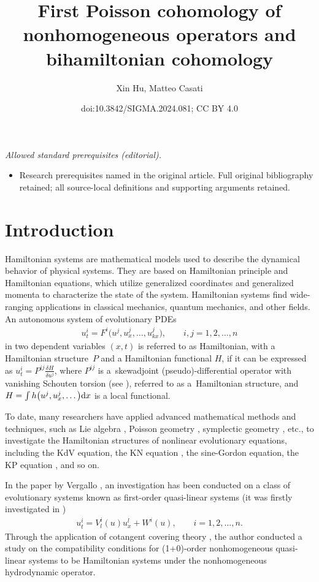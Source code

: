 \documentclass[10pt,a4paper]{amsart}
\title{First Poisson cohomology of nonhomogeneous operators and bihamiltonian cohomology}
\author{Xin Hu, Matteo Casati}
\date{doi:10.3842/SIGMA.2024.081; CC BY 4.0}
\numberwithin{equation}{section}
\begin{document}
\maketitle
\noindent\textit{Allowed standard prerequisites (editorial).}\begin{itemize}
\item Research prerequisites named in the original article. Full original bibliography retained; all source-local definitions and supporting arguments retained.
\end{itemize}\medskip
\section{Introduction}
Hamiltonian systems are mathematical models used to describe the dynamical behavior of physical systems. They are based on Hamiltonian principle and Hamiltonian equations, which utilize generalized coordinates and generalized momenta to characterize the state of the system. Hamiltonian systems find wide-ranging applications in classical mechanics, quantum mechanics, and other fields. An autonomous system of evolutionary PDEs
\begin{gather*}
u^i_t=F^i\big(u^j,u^j_x,\dots,u^j_{kx}\big), \qquad i,j=1,2,\dots,n
\end{gather*}
in two dependent variables $(x,t)$ is referred to as Hamiltonian, with a Hamiltonian structure~$P$ and a Hamiltonian functional $H$, if it can be
expressed as
$
u^i_t=P^{ij}\frac{\delta H}{\delta u^j}$,
where $P^{ij}$ is a~skewadjoint (pseudo)-differential operator with vanishing Schouten torsion (see \cite{olver1993applications}), referred to as a~Hamiltonian structure, and $H=\int h\big(u^j,u^j_x,\dots\big) {\rm d}x$ is a local functional.

To date, many researchers have applied advanced mathematical methods and techniques, such as Lie algebra \cite{olver1993applications}, Poisson geometry \cite{weinstein1983local}, symplectic geometry \cite{mokhov1995symplectic}, etc., to investigate the Hamiltonian structures of nonlinear evolutionary equations, including the KdV equation, the KN equation \cite{mokhov1995symplectic}, the sine-Gordon equation, the KP equation \cite{dubrovin2001integrable,olver1980hamiltonian}, and so on.

In the paper by Vergallo \cite{vergallo2023non}, an investigation has been conducted on a class of evolutionary systems known as first-order quasi-linear systems (it was firstly investigated in \cite{Vergallo_2022})
\begin{gather*}
u^i_t=V^i_l(u)u^l_x+W^i(u), \qquad i=1,2,\dots, n.
\end{gather*}
Through the application of cotangent covering theory \cite{krasil1989nonlocal,vergallo2021homogeneous}, the author conducted a study on the compatibility conditions for (1+0)-order nonhomogeneous quasi-linear systems to be Hamiltonian systems under the nonhomogeneous hydrodynamic operator.
\end{document}

